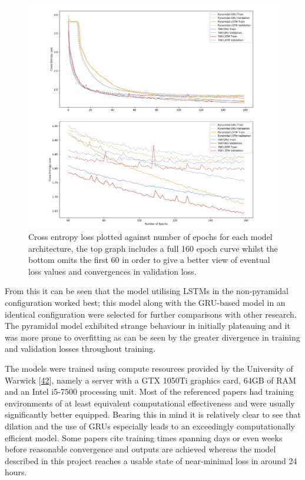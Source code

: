 \documentclass[12pt,]{article}
\begin{document}
\begin{figure}
\centering
\includegraphics{Images/loss.png}
\caption{Cross entropy loss plotted against number of epochs for each
model architecture, the top graph includes a full 160 epoch curve whilst
the bottom omits the first 60 in order to give a better view of eventual
loss values and convergences in validation loss.}
\end{figure}

From this it can be seen that the model utilising LSTMs in the
non-pyramidal configuration worked best; this model along with the
GRU-based model in an identical configuration were selected for further
comparisons with other research. The pyramidal model exhibited strange
behaviour in initially plateauing and it was more prone to overfitting
as can be seen by the greater divergence in training and validation
losses throughout training.

The models were trained using compute resources provided by the
University of Warwick
{[}\protect\hyperlink{ref-warwickcomputenodes}{42}{]}, namely a server
with a GTX 1050Ti graphics card, 64GB of RAM and an Intel i5-7500
processing unit. Most of the referenced papers had training environments
of at least equivalent computational effectiveness and were usually
significantly better equipped. Bearing this in mind it is relatively
clear to see that dilation and the use of GRUs especially leads to an
exceedingly computationally efficient model. Some papers cite training
times spanning days or even weeks before reasonable convergence and
outputs are achieved whereas the model described in this project reaches
a usable state of near-minimal loss in around 24 hours.
\end{document}
